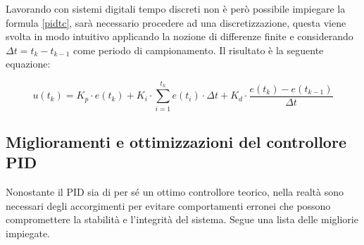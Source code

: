 \documentclass[12pt,twoside,openright]{article}
\begin{document}
Lavorando con sistemi digitali tempo discreti non è però possibile impiegare la formula \eqref{pidtc}, sarà necessario procedere ad una discretizzazione, questa viene svolta in modo intuitivo applicando la nozione di differenze finite e considerando $\Delta t = t_k - t_{k-1}$ come periodo di campionamento. Il risultato è la seguente equazione:

\begin{equation}\label{pidtd}
    u(t_k)=K_p \cdot e(t_k) + K_i \cdot \sum_{i=1}^{t_k} e(t_i)\cdot \Delta t + K_d\cdot \frac{e(t_k)-e(t_{k-1})}{\Delta t}
\end{equation}



\subsection{Miglioramenti e ottimizzazioni del controllore PID}
Nonostante il PID sia di per sé un ottimo controllore teorico, nella realtà sono necessari degli accorgimenti per evitare comportamenti erronei che possono compromettere la stabilità e l'integrità del sistema. Segue una lista delle migliorie impiegate.
\end{document}
